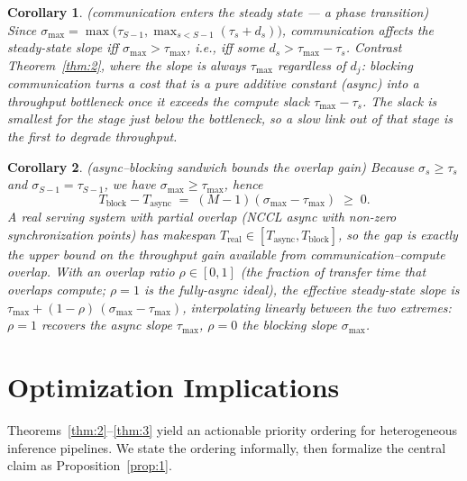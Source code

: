\documentclass[11pt]{article}
\newtheorem{corollary}{Corollary}
\begin{document}
\begin{corollary}\label{cor:4}(communication enters the steady state --- a phase transition)
Since $\sigma_{\max}=\max\big(\tau_{S-1},\max_{s<S-1}(\tau_s+d_s)\big)$, communication affects the steady-state slope iff $\sigma_{\max}>\tau_{\max}$, i.e., iff some $d_s>\tau_{\max}-\tau_s$. Contrast Theorem~\ref{thm:2}, where the slope is always $\tau_{\max}$ regardless of $d_j$: blocking communication turns a cost that is a pure additive constant (async) into a throughput bottleneck once it exceeds the compute slack $\tau_{\max}-\tau_s$. The slack is smallest for the stage just below the bottleneck, so a slow link out of \emph{that} stage is the first to degrade throughput.
\end{corollary}

\begin{corollary}\label{cor:5}(async--blocking sandwich bounds the overlap gain)
Because $\sigma_s\ge\tau_s$ and $\sigma_{S-1}=\tau_{S-1}$, we have $\sigma_{\max}\ge\tau_{\max}$, hence
\[
T_{\text{block}} - T_{\text{async}} \;=\; (M-1)(\sigma_{\max}-\tau_{\max}) \;\ge\; 0 .
\]
A real serving system with partial overlap (NCCL async with non-zero synchronization points) has makespan $T_{\text{real}}\in[T_{\text{async}},T_{\text{block}}]$, so the gap is exactly the \emph{upper bound on the throughput gain available from communication--compute overlap}. With an overlap ratio $\rho\in[0,1]$ (the fraction of transfer time that overlaps compute; $\rho=1$ is the fully-async ideal), the effective steady-state slope is $\tau_{\max}+(1-\rho)\,(\sigma_{\max}-\tau_{\max})$, interpolating linearly between the two extremes: $\rho=1$ recovers the async slope $\tau_{\max}$, $\rho=0$ the blocking slope $\sigma_{\max}$.
\end{corollary}

\section{Optimization Implications}\label{sec:opt}

Theorems~\ref{thm:2}--\ref{thm:3} yield an actionable priority ordering for heterogeneous inference pipelines. We state the ordering informally, then formalize the central claim as Proposition~\ref{prop:1}.
\end{document}
